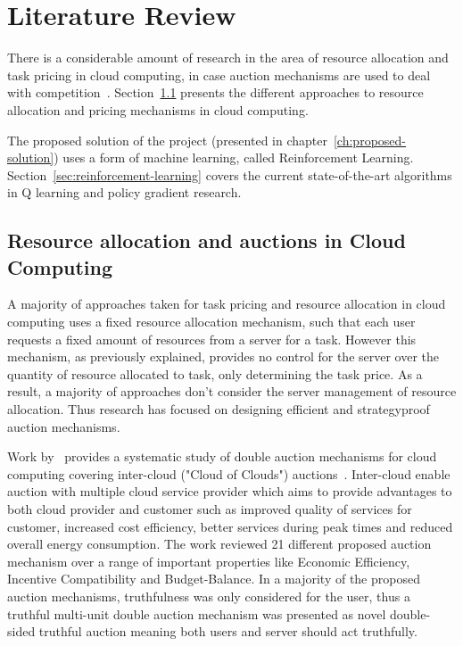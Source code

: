 \chapter{Literature Review}\label{ch:literature-review}
There is a considerable amount of research in the area of resource allocation and task pricing in cloud computing,
in case auction mechanisms are used to deal with competition~\citep{KUMAR2017234,Zhang2017,Du2019,Bi2019}.
Section~\ref{sec:resource-allocation-and-auctions-in-cloud-computing} presents the different approaches to resource
allocation and pricing mechanisms in cloud computing.

The proposed solution of the project (presented in chapter~\ref{ch:proposed-solution}) uses a form of
machine learning, called Reinforcement Learning. Section~\ref{sec:reinforcement-learning} covers the current
state-of-the-art algorithms in Q learning and policy gradient research.

\section{Resource allocation and auctions in Cloud Computing}\label{sec:resource-allocation-and-auctions-in-cloud-computing}
A majority of approaches taken for task pricing and resource allocation in cloud computing uses a fixed resource
allocation mechanism, such that each user requests a fixed amount of resources from a server for a task. However this
mechanism, as previously explained, provides no control for the server over the quantity of resource allocated to task,
only determining the task price. As a result, a majority of approaches don't consider the server management of resource
allocation. Thus research has focused on designing efficient and strategyproof auction mechanisms.

Work by~\cite{KUMAR2017234} provides a systematic study of double auction mechanisms for cloud computing covering
inter-cloud ("Cloud of Clouds") auctions~\citep{interclouds}. Inter-cloud enable auction with multiple cloud service
provider which aims to provide advantages to both cloud provider and customer such as improved quality of services for
customer, increased cost efficiency, better services during peak times and reduced overall energy consumption.
The work reviewed 21 different proposed auction mechanism over a range of important properties like Economic Efficiency,
Incentive Compatibility and Budget-Balance. In a majority of the proposed auction mechanisms, truthfulness was only
considered for the user, thus a truthful multi-unit double auction mechanism was presented as novel double-sided
truthful auction meaning both users and server should act truthfully.

